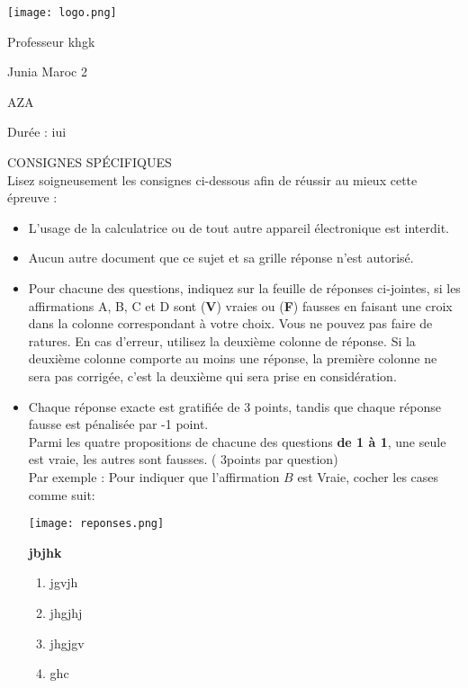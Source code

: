 \documentclass{book}%
\begin{document}
%
\normalsize%
\newpage%
\thispagestyle{empty}%
\vskip-40mm	\texttt{[image: logo.png]} \\%
 \begin{flushright}  \vskip-20mm   Professeur khgk\vskip15mm  \end{flushright}%
Junia Maroc 2%
\begin{center}   \begin{Large}AZA\end{Large} \end{center}%
Durée : iui%
 \begin{center} { \large CONSIGNES SPÉCIFIQUES } \\ Lisez soigneusement les consignes ci-dessous afin de réussir au mieux cette épreuve : \end{center} %
\begin{itemize}%
\item%
L'usage de la calculatrice ou de tout autre appareil électronique est interdit.%
\item%
Aucun autre document que ce sujet et sa grille réponse n'est autorisé.%
\item%
Pour chacune des questions, indiquez sur la feuille de réponses ci-jointes, si les affirmations A, B, C et D sont (\textbf{V}) vraies ou (\textbf{F}) fausses en faisant une croix dans la colonne correspondant à votre choix. Vous ne pouvez pas faire de ratures. En cas d'erreur, utilisez la deuxième colonne de réponse. Si la deuxième colonne comporte au moins une réponse, la première colonne ne sera pas corrigée, c'est la deuxième qui sera prise en considération.%
\item%
Chaque réponse exacte est gratifiée de 3 points, tandis que chaque réponse fausse est pénalisée par -1 point. \\ 	Parmi les quatre propositions de chacune des questions \textbf{de 1 à 1}, une seule est vraie, les autres sont fausses. ( 3points par question) \\ 	Par exemple : Pour indiquer que l'affirmation $B$ est Vraie, cocher les cases comme suit:  \\ \begin{center}	\texttt{[image: reponses.png]} \end{center}%
\begin{exercise}%
\textbf{jbjhk }%
\begin{enumerate}[label=\textbf{\Alph*. }]%
\item%
jgvjh%
\item%
jhgjhj%
\item%
jhgjgv%
\item%
ghc%
\end{enumerate}%
\end{exercise}%
\end{itemize}%
\end{document}
